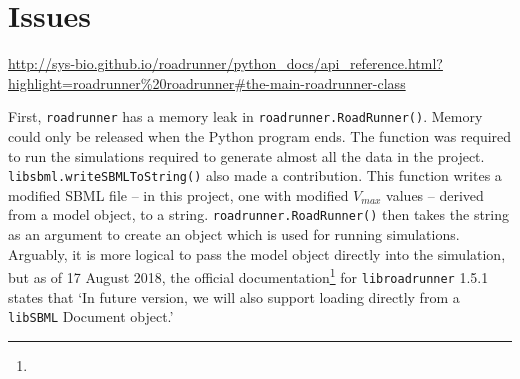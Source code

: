 \documentclass[parskip=full, numbers=noenddot]{scrreprt}
\begin{document}




\section{Issues}
\label{sec:issues}

\urldef\myurl\url{http://sys-bio.github.io/roadrunner/python_docs/api_reference.html?highlight=roadrunner%20roadrunner#the-main-roadrunner-class}

First, \texttt{roadrunner} has a memory leak in \texttt{road\-runner.\-Road\-Runner\-()}. Memory could only be released when the Python program ends. The function was required to run the simulations required to generate almost all the data in the project. \texttt{libsbml\-.write\-SBML\-To\-String\-()} also made a contribution. This function writes a modified SBML file -- in this project, one with modified $V_{max}$ values -- derived from a model object, to a string. \texttt{road\-runner.\-Road\-Runner\-()} then takes the string as an argument to create an object which is used for running simulations. Arguably, it is more logical to pass the model object directly into the simulation, but as of 17 August 2018, the official documentation\footnote{\myurl} for \texttt{libroadrunner} 1.5.1 states that `In future version, we will also support loading directly from a \texttt{libSBML} Document object.'
\end{document}
